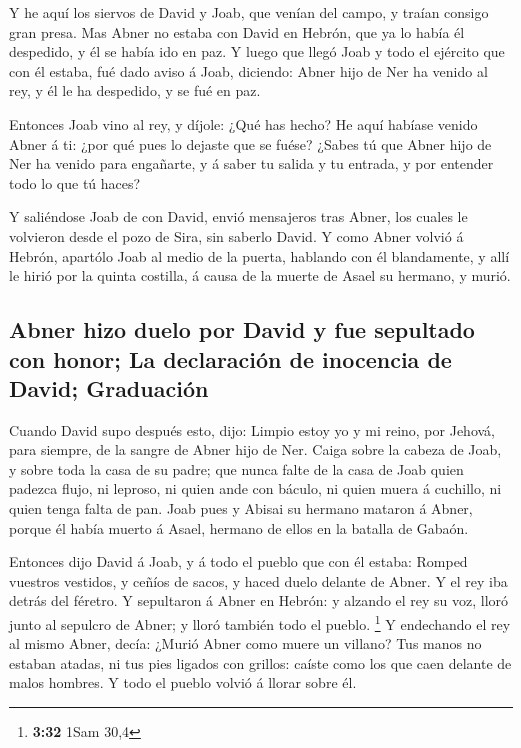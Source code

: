  Y he aquí los siervos de David y Joab, que venían del
campo, y traían consigo gran presa. Mas Abner no estaba con David en
Hebrón, que ya lo había él despedido, y él se había ido en paz.
 Y luego que llegó Joab y todo el ejército que con él
estaba, fué dado aviso á Joab, diciendo: Abner hijo de Ner ha venido al
rey, y él le ha despedido, y se fué en paz.

 Entonces Joab vino al rey, y díjole: ¿Qué has hecho? He
aquí habíase venido Abner á ti: ¿por qué pues lo dejaste que se fuése?
 ¿Sabes tú que Abner hijo de Ner ha venido para engañarte,
y á saber tu salida y tu entrada, y por entender todo lo que tú haces?

 Y saliéndose Joab de con David, envió mensajeros tras
Abner, los cuales le volvieron desde el pozo de Sira, sin saberlo David.
 Y como Abner volvió á Hebrón, apartólo Joab al medio de la
puerta, hablando con él blandamente, y allí le hirió por la quinta
costilla, á causa de la muerte de Asael su hermano, y murió.

\hypertarget{abner-hizo-duelo-por-david-y-fue-sepultado-con-honor-la-declaraciuxf3n-de-inocencia-de-david-graduaciuxf3n}{%
\subsection{Abner hizo duelo por David y fue sepultado con honor; La
declaración de inocencia de David;
Graduación}\label{abner-hizo-duelo-por-david-y-fue-sepultado-con-honor-la-declaraciuxf3n-de-inocencia-de-david-graduaciuxf3n}}

 Cuando David supo después esto, dijo: Limpio estoy yo y mi
reino, por Jehová, para siempre, de la sangre de Abner hijo de Ner.
 Caiga sobre la cabeza de Joab, y sobre toda la casa de su
padre; que nunca falte de la casa de Joab quien padezca flujo, ni
leproso, ni quien ande con báculo, ni quien muera á cuchillo, ni quien
tenga falta de pan.  Joab pues y Abisai su hermano mataron
á Abner, porque él había muerto á Asael, hermano de ellos en la batalla
de Gabaón.

 Entonces dijo David á Joab, y á todo el pueblo que con él
estaba: Romped vuestros vestidos, y ceñíos de sacos, y haced duelo
delante de Abner. Y el rey iba detrás del féretro.  Y
sepultaron á Abner en Hebrón: y alzando el rey su voz, lloró junto al
sepulcro de Abner; y lloró también todo el pueblo. \footnote{\textbf{3:32}
  1Sam 30,4}  Y endechando el rey al mismo Abner, decía:
¿Murió Abner como muere un villano?  Tus manos no estaban
atadas, ni tus pies ligados con grillos: caíste como los que caen
delante de malos hombres. Y todo el pueblo volvió á llorar sobre él.

